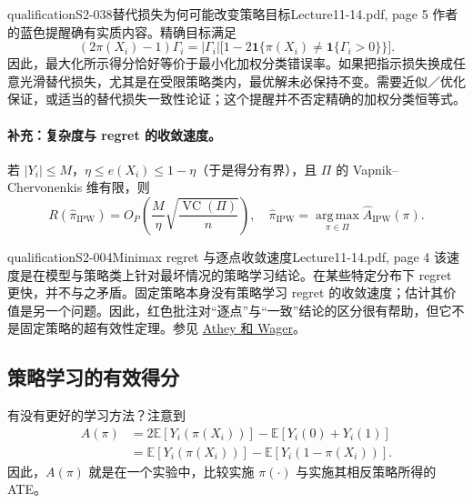 \begin{reviewnote}{qualification}{S2-038}{替代损失为何可能改变策略目标}{Lecture11-14.pdf, page 5}
作者的蓝色提醒确有实质内容。精确目标满足
\[
 (2\pi(X_i)-1)\Gamma_i
 =|\Gamma_i|\bigl[1-2\mathbf1\{\pi(X_i)\ne\mathbf1\{\Gamma_i>0\}\}\bigr].
\]
因此，最大化所示得分恰好等价于最小化加权分类错误率。如果把指示损失换成任意光滑替代损失，尤其是在受限策略类内，最优解未必保持不变。需要近似／优化保证，或适当的替代损失一致性论证；这个提醒并不否定精确的加权分类恒等式。
\end{reviewnote}

\paragraph{补充：复杂度与 regret 的收敛速度。}
若 $|Y_i|\le M$，$\eta\le e(X_i)\le1-\eta$（于是得分有界），且 $\Pi$ 的 Vapnik--Chervonenkis 维有限，则
\[
 R(\widehat\pi_{\mathrm{IPW}})
 =O_P\left(\frac M\eta\sqrt{\frac{\operatorname{VC}(\Pi)}n}\right),
 \quad
 \widehat\pi_{\mathrm{IPW}}=
 \operatorname*{arg\,max}_{\pi\in\Pi}\widehat A_{\mathrm{IPW}}(\pi).
\]

\begin{reviewnote}{qualification}{S2-004}{Minimax regret 与逐点收敛速度}{Lecture11-14.pdf, page 4}
该速度是在模型与策略类上针对最坏情况的策略学习结论。在某些特定分布下 regret 更快，并不与之矛盾。固定策略本身没有策略学习 regret 的收敛速度；估计其价值是另一个问题。因此，红色批注对“逐点”与“一致”结论的区分很有帮助，但它不是固定策略的超有效性定理。参见 \href{https://arxiv.org/abs/1702.02896}{Athey 和 Wager}。
\end{reviewnote}


\subsection{策略学习的有效得分}
有没有更好的学习方法？注意到
\begin{align*}
 A(\pi)&=2\mathbb E[Y_i(\pi(X_i))]-\mathbb E[Y_i(0)+Y_i(1)]\\
 &=\mathbb E[Y_i(\pi(X_i))]-\mathbb E[Y_i(1-\pi(X_i))].
\end{align*}
因此，$A(\pi)$ 就是在一个实验中，比较实施 $\pi(\cdot)$ 与实施其相反策略所得的 ATE。


